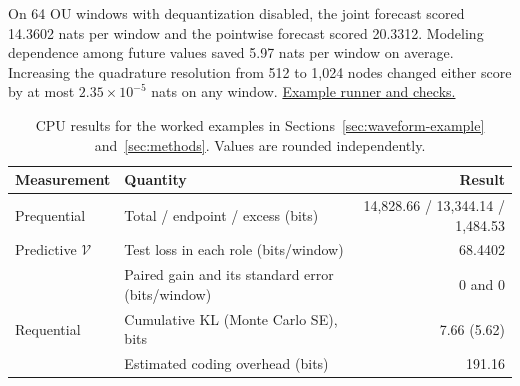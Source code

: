 \documentclass[11pt,a4paper]{article}
\newcommand{\repolink}[2]{\href{https://github.com/intsystems/Epiplexity/blob/main/#1}{#2}}
\begin{document}
On 64 OU windows with dequantization disabled, the joint forecast scored
14.3602 nats per window and the pointwise forecast scored 20.3312. Modeling
dependence among future values saved 5.97 nats per window on average.
Increasing the quadrature resolution from 512 to 1,024 nodes changed either
score by at most $2.35\times10^{-5}$ nats on any window.
\repolink{publications/technical_report/run_examples.py}{Example runner and checks.}

\begin{table}[H]
\centering\small
\caption{CPU results for the worked examples in Sections~\ref{sec:waveform-example}
and~\ref{sec:methods}. Values are rounded independently.}
\label{tab:example-results}
\begin{tabularx}{\linewidth}{@{}l >{\raggedright\arraybackslash}X r@{}}
\toprule
Measurement & Quantity & Result\\
\midrule
Prequential & Total / endpoint / excess (bits) & 14,828.66 / 13,344.14 / 1,484.53\\
Predictive $\mathcal V$ & Test loss in each role (bits/window) & 68.4402\\
 & Paired gain and its standard error (bits/window) & 0 and 0\\
Requential & Cumulative KL (Monte Carlo SE), bits & 7.66 (5.62)\\
 & Estimated coding overhead (bits) & 191.16\\
\bottomrule
\end{tabularx}
\end{table}
\end{document}
